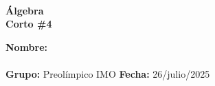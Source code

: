 \begin{center}
    \ \\
    \vspace{-1mm}
    \textbf{\Large Álgebra \\ \vspace{2mm}Corto \#4}
\end{center}
\vspace{6mm}
\textbf{Nombre:} \hrulefill\\
\vspace{-2mm}\\
\textbf{Grupo:} Preolímpico IMO \hfill \textbf{Fecha:} 26/julio/2025\\
\vspace{-8mm}
\thispagestyle{first-page-style}